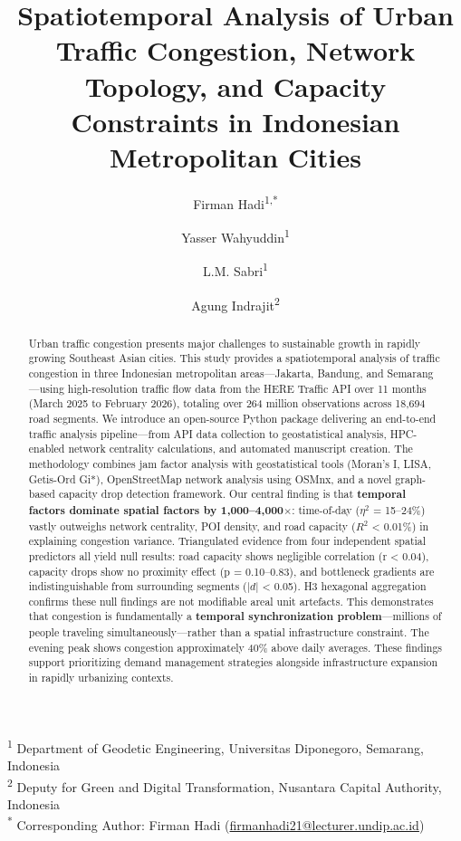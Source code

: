 \documentclass[12pt,a4paper]{article}
\title{Spatiotemporal Analysis of Urban Traffic Congestion, Network Topology, and Capacity Constraints in Indonesian Metropolitan Cities}
\author{%
  Firman Hadi\textsuperscript{1,*} \and
  Yasser Wahyuddin\textsuperscript{1} \and
  L.M. Sabri\textsuperscript{1} \and
  Agung Indrajit\textsuperscript{2}%
}
\date{}
\begin{document}
\maketitle

\noindent\textsuperscript{1} Department of Geodetic Engineering, Universitas Diponegoro, Semarang, Indonesia\\
\textsuperscript{2} Deputy for Green and Digital Transformation, Nusantara Capital Authority, Indonesia\\[6pt]
\textsuperscript{*} Corresponding Author: Firman Hadi (\href{mailto:firmanhadi21@lecturer.undip.ac.id}{firmanhadi21@lecturer.undip.ac.id})

\bigskip

\begin{abstract}
Urban traffic congestion presents major challenges to sustainable growth in rapidly growing Southeast Asian cities. This study provides a spatiotemporal analysis of traffic congestion in three Indonesian metropolitan areas—Jakarta, Bandung, and Semarang—using high-resolution traffic flow data from the HERE Traffic API over 11 months (March 2025 to February 2026), totaling over 264 million observations across 18,694 road segments. We introduce an open-source Python package delivering an end-to-end traffic analysis pipeline—from API data collection to geostatistical analysis, HPC-enabled network centrality calculations, and automated manuscript creation. The methodology combines jam factor analysis with geostatistical tools (Moran's I, LISA, Getis-Ord Gi*), OpenStreetMap network analysis using OSMnx, and a novel graph-based capacity drop detection framework. Our central finding is that \textbf{temporal factors dominate spatial factors by 1,000--4,000$\times$}: time-of-day ($\eta^2$ = 15--24\%) vastly outweighs network centrality, POI density, and road capacity ($R^2$ < 0.01\%) in explaining congestion variance. Triangulated evidence from four independent spatial predictors all yield null results: road capacity shows negligible correlation (r < 0.04), capacity drops show no proximity effect (p = 0.10--0.83), and bottleneck gradients are indistinguishable from surrounding segments ($|d|$ < 0.05). H3 hexagonal aggregation confirms these null findings are not modifiable areal unit artefacts. This demonstrates that congestion is fundamentally a \textbf{temporal synchronization problem}—millions of people traveling simultaneously—rather than a spatial infrastructure constraint. The evening peak shows congestion approximately 40\% above daily averages. These findings support prioritizing demand management strategies alongside infrastructure expansion in rapidly urbanizing contexts.
\end{abstract}
\end{document}
